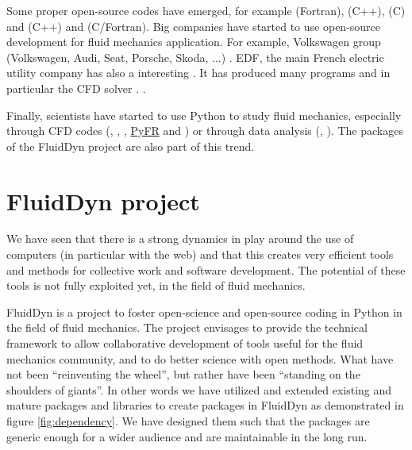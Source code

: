 Some proper open-source codes have emerged, for example
 (Fortran),
 (C++),
 (C) and
 (C++) and
 (C/Fortran).
%
Big companies have started to use open-source development for fluid mechanics
application. For example, Volkswagen group (Volkswagen, Audi, Seat, Porsche,
Skoda, ...) .
%
EDF, the main French electric utility company has also a interesting
. It has produced many programs and in particular the CFD
solver .
%
.

Finally, scientists have started to use Python to study fluid mechanics,
especially through CFD codes (,
,
, \href{http://pyfr.org/}{PyFR}
and ) or through data analysis
(,
).
%
The packages of the FluidDyn project are also part of this trend.

\section{FluidDyn project}
We have seen that there is a strong dynamics in play around the use of
computers (in particular with the web) and that this creates very efficient
tools and methods for collective work and software development.
%
The potential of these tools is not fully exploited yet, in the field of fluid
mechanics.

FluidDyn is a project to foster open-science and open-source coding in Python
in the field of fluid mechanics.
%
The project envisages to provide the technical framework to allow collaborative
development of tools useful for the fluid mechanics community, and to do better
science with open methods.
%
What have not been ``reinventing the wheel'', but rather have been ``standing
on the shoulders of giants''. In other words we have utilized and extended
existing and mature packages and libraries to create packages in FluidDyn as
demonstrated in figure \ref{fig:dependency}. We have designed them such that
the packages are generic enough for a wider audience and are maintainable in
the long run.

